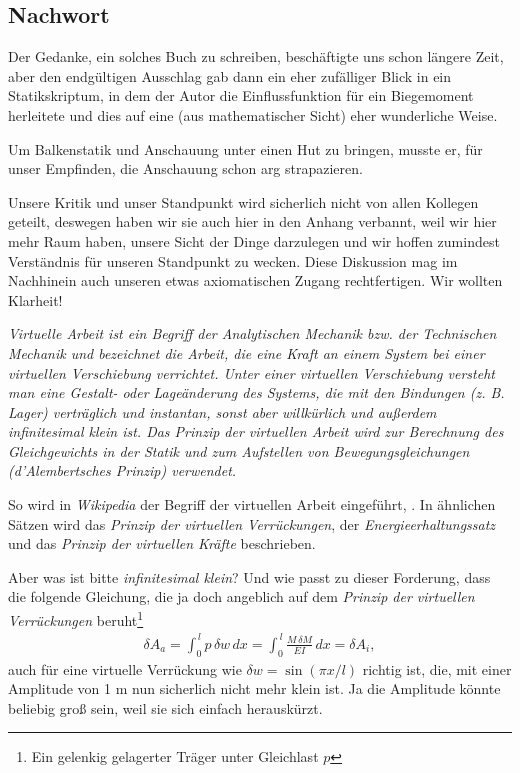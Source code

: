 \textcolor{blau2}{\chapter{Nachwort }}
Der Gedanke, ein solches Buch zu schreiben, besch\"{a}ftigte uns schon l\"{a}ngere Zeit, aber den endg\"{u}ltigen Ausschlag gab dann ein eher zuf\"{a}lliger Blick in ein Statikskriptum, in dem der Autor die Einflussfunktion f\"{u}r ein Biegemoment herleitete und dies auf eine (aus mathematischer Sicht) eher wunderliche Weise.

Um Balkenstatik und Anschauung unter einen Hut zu bringen, musste er, f\"{u}r unser Empfinden, die Anschauung schon arg strapazieren.

Unsere Kritik und unser Standpunkt wird sicherlich nicht von allen Kollegen geteilt, deswegen haben wir sie auch hier in den Anhang verbannt, weil wir hier mehr Raum haben, unsere Sicht der Dinge darzulegen und wir hoffen zumindest Verst\"{a}ndnis f\"{u}r unseren Standpunkt zu wecken. Diese Diskussion mag im Nachhinein auch unseren etwas axiomatischen Zugang rechtfertigen. Wir wollten Klarheit!

{\em Virtuelle Arbeit ist ein Begriff der Analytischen Mechanik bzw. der Technischen Mechanik und bezeichnet die Arbeit, die eine Kraft an einem System bei einer virtuellen Verschiebung verrichtet. Unter einer virtuellen Verschiebung versteht man eine Gestalt- oder Lage\"{a}nderung des Systems, die mit den Bindungen (z. B. Lager) vertr\"{a}glich und \glq instantan\grq{}, sonst aber willk\"{u}rlich und au{\ss}erdem infinitesimal klein ist. Das Prinzip der virtuellen Arbeit wird zur Berechnung des Gleichgewichts in der Statik und zum Aufstellen von Bewegungsgleichungen (d'Alembertsches Prinzip) verwendet.\/}

So wird in {\em Wikipedia\/} der Begriff der virtuellen Arbeit eingef\"{u}hrt, \cite{VA}. In \"{a}hnlichen S\"{a}tzen wird das {\em Prinzip der virtuellen Verr\"{u}ckungen\/}, der {\em Energieerhaltungssatz\/} und das {\em Prinzip der virtuellen Kr\"{a}fte\/} beschrieben.

Aber was ist bitte {\em \glq infinitesimal klein\grq{}\/}? Und wie passt zu dieser Forderung, dass die folgende Gleichung, die ja doch angeblich auf dem {\em Prinzip der virtuellen Verr\"{u}ckungen\/} beruht\footnote{Ein gelenkig gelagerter Tr\"{a}ger unter Gleichlast $p$}
\begin{align}\label{Eq82}
\delta A_a = \int_0^{\,l} p\,\delta w\,dx = \int_0^{\,l} \frac{M\,\delta M}{EI} \,dx = \delta A_i,
\end{align}
auch f\"{u}r eine virtuelle Verr\"{u}ckung wie $\delta w = \sin (\pi x/l)$ richtig ist, die, mit einer Amplitude von 1 m nun sicherlich nicht mehr klein ist. Ja die Amplitude k\"{o}nnte beliebig gro{\ss} sein, weil sie sich einfach herausk\"{u}rzt.

